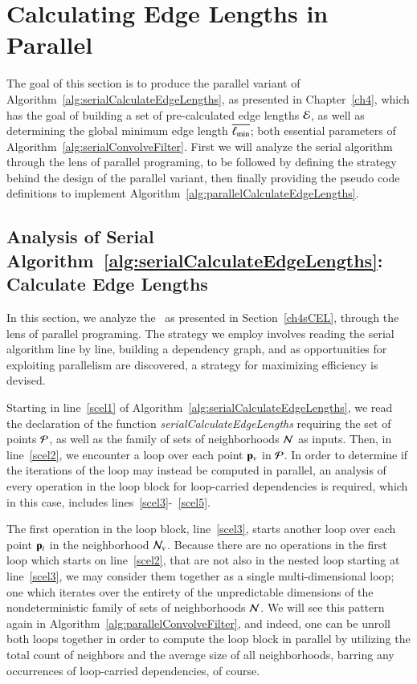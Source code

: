 %
%
%
%
\section{Calculating Edge Lengths in Parallel}
\label{ch5sCELP}
The goal of this section is to produce the parallel variant of  Algorithm~\ref{alg:serialCalculateEdgeLengths}, as presented in Chapter~\ref{ch4}, which has the goal of building a set of pre-calculated edge lengths $\mathcal{E}$, as well as determining the global minimum edge length $\overline{\ell_\text{min}}$; both essential parameters of Algorithm~\ref{alg:serialConvolveFilter}. First we will analyze the serial algorithm through the lens of parallel programing, to be followed by defining the strategy behind the design of the parallel variant, then finally providing the pseudo code definitions to implement Algorithm~\ref{alg:parallelCalculateEdgeLengths}.


%
%
\subsection{Analysis of Serial Algorithm~\ref{alg:serialCalculateEdgeLengths}: Calculate Edge Lengths}
\label{ch5sCELPssASACEL}
In this section, we analyze the~ as presented in Section~\ref{ch4sCEL}, through the lens of parallel programing. The strategy we employ involves reading the serial algorithm line by line, building a dependency graph, and as opportunities for exploiting parallelism are discovered, a strategy for maximizing efficiency is devised.

Starting in line~\ref{scel1} of Algorithm~\ref{alg:serialCalculateEdgeLengths}, we read the declaration of the function \textit{serialCalculateEdgeLengths} requiring the set of points $\mathcal{P}$, as well as the family of sets of neighborhoods $\mathcal{N}$ as inputs. Then, in line~\ref{scel2}, we encounter a loop over each point $\mathbf{p}_v$ in $\mathcal{P}$. In order to determine if the iterations of the loop may instead be computed in parallel, an analysis of every operation in the loop block for loop-carried dependencies is required, which in this case, includes lines~\ref{scel3}-~\ref{scel5}.

The first operation in the loop block, line~\ref{scel3}, starts another loop over each point $\mathbf{p}_i$ in the neighborhood $\mathcal{N}_v$. Because there are no operations in the first loop which starts on line~\ref{scel2}, that are not also in the nested loop starting at line~\ref{scel3}, we may consider them together as a single multi-dimensional loop; one which iterates over the entirety of the unpredictable dimensions of the nondeterministic family of sets of neighborhoods $\mathcal{N}$. We will see this pattern again in Algorithm~\ref{alg:parallelConvolveFilter}, and indeed, one can be unroll both loops together in order to compute the loop block in parallel by utilizing the total count of neighbors and the average size of all neighborhoods, barring any occurrences of loop-carried dependencies, of course.

